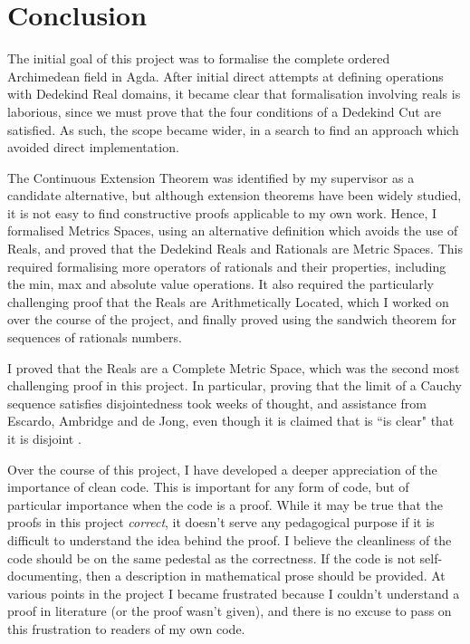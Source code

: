 \documentclass[ProjectReport]{subfiles}
\begin{document}
\section{Conclusion}

The initial goal of this project was to formalise the complete ordered Archimedean field in Agda. After initial direct attempts at defining operations with Dedekind Real domains, it became clear that formalisation involving reals is laborious, since we must prove that the four conditions of a Dedekind Cut are satisfied. As such, the scope became wider, in a search to find an approach which avoided direct implementation.

The Continuous Extension Theorem was identified by my supervisor as a candidate alternative, but although extension theorems have been widely studied, it is not easy to find constructive proofs applicable to my own work. Hence, I formalised Metrics Spaces, using an alternative definition which avoids the use of Reals, and proved that the Dedekind Reals and Rationals are Metric Spaces. This required formalising more operators of rationals and their properties, including the min, max and absolute value operations. It also required the particularly challenging proof that the Reals are Arithmetically Located, which I worked on over the course of the project, and finally proved using the sandwich theorem for sequences of rationals numbers.

I proved that the Reals are a Complete Metric Space, which was the second most challenging proof in this project. In particular, proving that the limit of a Cauchy sequence satisfies disjointedness took weeks of thought, and assistance from Escardo, Ambridge and de Jong, even though it is claimed that is ``is clear" that it is disjoint \cite[Theorem.11.2.12]{hottbook}.

Over the course of this project, I have developed a deeper appreciation of the importance of clean code. This is important for any form of code, but of particular importance when the code is a proof. While it may be true that the proofs in this project \textit{correct}, it doesn't serve any pedagogical purpose if it is difficult to understand the idea behind the proof. I believe the cleanliness of the code should be on the same pedestal as the correctness. If the code is not self-documenting, then a description in mathematical prose should be provided. At various points in the project I became frustrated because I couldn't understand a proof in literature (or the proof wasn't given), and there is no excuse to pass on this frustration to readers of my own code. 
\end{document}
